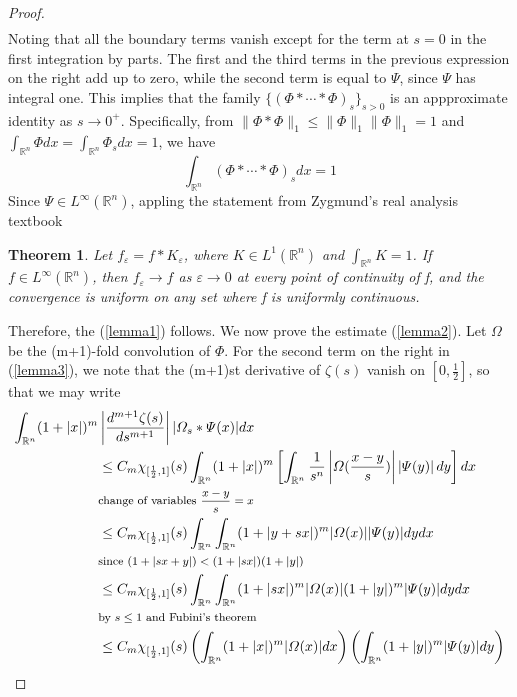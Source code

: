 \documentclass[12pt]{article}  %
\numberwithin{equation}{subsection}
\newtheorem{thm}{Theorem}[section]  %
\theoremstyle{plain}
\begin{document}
\begin{proof}
\begin{align*}
	\end{align*}
	Noting that all the boundary terms vanish except for the term at $s = 0$ in the first integration by parts. The first and the third terms in the previous expression on the right add up to zero, while the second term is equal to $\varPsi$, since $\varPsi$ has integral one. This implies that the family $\{(\varPhi*\cdots*\varPhi)_s\}_{s>0}$ is an appproximate identity as $s \rightarrow 0^+$. Specifically, from $\|\varPhi*\varPhi\|_1 \le \|\varPhi\|_1\|\varPhi\|_1 = 1$ and $\int_{\mathbb{R}^n}\varPhi dx = \int_{\mathbb{R}^n}\varPhi_s dx = 1$, we have
	$$	
	\int_{\mathbb{R}^n}(\varPhi*\cdots*\varPhi)_s dx = 1
	$$
	Since $\varPsi \in L^{\infty}(\mathbb{R}^n)$, appling the statement from Zygmund's real analysis textbook
	\begin{thm}
		Let $f_{\varepsilon} = f*K_{\varepsilon}$, where $K\in L^1(\mathbb{R}^n)$ and $\int_{\mathbb{R}^n}K = 1$. If $f \in L^{\infty}(\mathbb{R}^n)$, then $f_{\varepsilon}\rightarrow f$ as $\varepsilon \rightarrow 0$ at every point of continuity of f, and the convergence is uniform on any set where f is uniformly continuous.
	\end{thm}
	Therefore, the (\ref{lemma1}) follows. We now prove the estimate (\ref{lemma2}). Let $\varOmega$ be the (m+1)-fold convolution of $\varPhi$. For the second term on the right in (\ref{lemma3}), we note that the (m+1)st derivative of $\zeta(s)$ vanish on $[0,\frac{1}{2}]$, so that we may write
	\begin{align*}
	\int_{\mathbb{R}^n}(1+|x|)^m&\left| \frac{d^{m+1}\zeta(s)}{ds^{m+1}}\right| |\varOmega_s*\varPsi(x)|dx \\
	&\le C_m\chi_{[\frac{1}{2},1]}(s)\int_{\mathbb{R}^n}(1+|x|)^m \left[ \int_{\mathbb{R}^n}\frac{1}{s^n} \left| \varOmega(\frac{x-y}{s})\right| \left| \varPsi(y)\right| dy  \right] dx \\
	\text{\footnotesize\rlap{change of variables $\frac{x-y}{s} = x$}}\\
	&\le C_m\chi_{[\frac{1}{2},1]}(s)\int_{\mathbb{R}^n}\int_{\mathbb{R}^n}(1+|y+sx|)^m |\varOmega(x)||\varPsi(y)|dydx\\ 
	\text{\footnotesize\rlap{since $(1+|sx+y|)<(1+|sx|)(1+|y|)$}}\\
	&\le C_m\chi_{[\frac{1}{2},1]}(s)\int_{\mathbb{R}^n}\int_{\mathbb{R}^n}(1+|sx|)^m |\varOmega(x)|(1+|y|)^m|\varPsi(y)|dydx\\
	\text{\footnotesize\rlap{by $s\le 1$ and Fubini's theorem}}\\
	&\le C_m\chi_{[\frac{1}{2},1]}(s)\left( \int_{\mathbb{R}^n}(1+|x|)^m |\varOmega(x)|dx\right) \left( \int_{\mathbb{R}^n}(1+|y|)^m|\varPsi(y)|dy \right) \\

\end{align*}
\end{proof}
\end{document}
